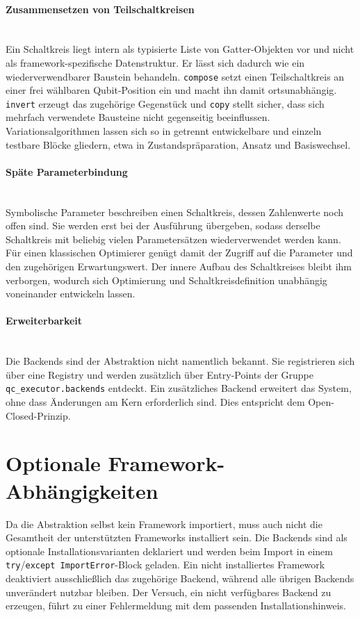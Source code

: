 \paragraph*{Zusammensetzen von Teilschaltkreisen}\mbox{}\\
Ein Schaltkreis liegt intern als typisierte Liste von Gatter-Objekten vor und
nicht als framework-spezifische Datenstruktur. Er lässt sich dadurch wie ein
wiederverwendbarer Baustein behandeln. \texttt{compose} setzt einen
Teilschaltkreis an einer frei wählbaren Qubit-Position ein und macht ihn damit
ortsunabhängig. \texttt{invert} erzeugt das zugehörige Gegenstück und
\texttt{copy} stellt sicher, dass sich mehrfach verwendete Bausteine nicht
gegenseitig beeinflussen. Variationsalgorithmen lassen sich so in getrennt
entwickelbare und einzeln testbare Blöcke gliedern, etwa in Zustandspräparation,
Ansatz und Basiswechsel.

\paragraph*{Späte Parameterbindung}\mbox{}\\
Symbolische Parameter beschreiben einen Schaltkreis, dessen Zahlenwerte noch
offen sind. Sie werden erst bei der Ausführung übergeben, sodass derselbe
Schaltkreis mit beliebig vielen Parametersätzen wiederverwendet werden kann. Für
einen klassischen Optimierer genügt damit der Zugriff auf die Parameter und den
zugehörigen Erwartungswert. Der innere Aufbau des Schaltkreises bleibt ihm
verborgen, wodurch sich Optimierung und Schaltkreisdefinition unabhängig
voneinander entwickeln lassen.

\paragraph*{Erweiterbarkeit}\mbox{}\\
Die Backends sind der Abstraktion nicht namentlich bekannt. Sie registrieren sich
über eine Registry und werden zusätzlich über Entry-Points der Gruppe
\texttt{qc\_executor.backends} entdeckt. Ein zusätzliches Backend erweitert das
System, ohne dass Änderungen am Kern erforderlich sind. Dies entspricht dem
Open-Closed-Prinzip.

\section{Optionale Framework-Abhängigkeiten}
\label{sec:vorteile_abhaengigkeiten}

Da die Abstraktion selbst kein Framework importiert, muss auch nicht die
Gesamtheit der unterstützten Frameworks installiert sein. Die Backends sind als
optionale Installationsvarianten deklariert und werden beim Import in einem
\texttt{try}/\texttt{except~ImportError}-Block geladen. Ein nicht installiertes
Framework deaktiviert ausschließlich das zugehörige Backend, während alle
übrigen Backends unverändert nutzbar bleiben. Der Versuch, ein nicht verfügbares
Backend zu erzeugen, führt zu einer Fehlermeldung mit dem passenden
Installationshinweis.

